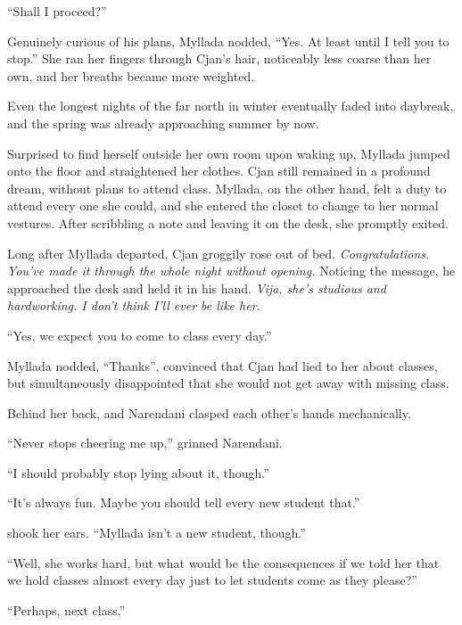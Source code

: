 ``Shall I proceed?''

Genuinely curious of his plans, Myllada nodded, ``Yes. At least until I tell you to stop.'' She ran her fingers through Cjan's hair, noticeably less coarse than her own, and her breaths became more weighted.

\centeredstars

Even the longest nights of the far north in winter eventually faded into daybreak, and the spring was already approaching summer by now.

Surprised to find herself outside her own room upon waking up, Myllada jumped onto the floor and straightened her clothes. Cjan still remained in a profound dream, without plans to attend class. Myllada, on the other hand, felt a duty to attend every one she could, and she entered the closet to change to her normal vestures. After scribbling a note and leaving it on the desk, she promptly exited.


Long after Myllada departed, Cjan groggily rose out of bed. \emph{Congratulations. You've made it through the whole night without opening.} Noticing the message, he approached the desk and held it in his hand. \emph{Vija, she's studious and hardworking. I don't think I'll ever be like her.}

\centeredstars

``Yes, we expect you to come to class every day.''

Myllada nodded, ``Thanks'', convinced that Cjan had lied to her about classes, but simultaneously disappointed that she would not get away with missing class.

Behind her back, \yronsyncra{} and Narendani clasped each other's hands mechanically.

``Never stops cheering me up,'' grinned Narendani.

``I should probably stop lying about it, though.''

``It's always fun. Maybe you should tell every new student that.''

\yronsyncra shook her ears. ``Myllada isn't a new student, though.''

``Well, she works hard, but what would be the consequences if we told her that we hold classes almost every day just to let students come as they please?''

``Perhaps, next class.''

